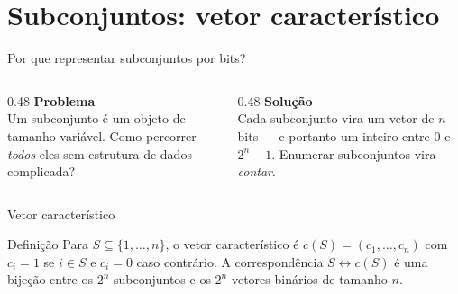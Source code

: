 \documentclass[aspectratio=169]{beamer}
\begin{document}
\section{Subconjuntos: vetor característico}

\begin{frame}{Por que representar subconjuntos por bits?}
  \begin{columns}[T]
    \begin{column}{0.48\textwidth}
      \textbf{Problema}\\[2pt]
      Um subconjunto é um objeto de tamanho variável. Como percorrer
      \emph{todos} eles sem estrutura de dados complicada?
    \end{column}
    \begin{column}{0.48\textwidth}
      \textbf{Solução}\\[2pt]
      Cada subconjunto vira um vetor de $n$ bits --- e portanto um inteiro
      entre $0$ e $2^n - 1$. Enumerar subconjuntos vira \emph{contar}.
    \end{column}
  \end{columns}
\end{frame}

\begin{frame}{Vetor característico}
  \begin{block}{Definição}
    Para $S \subseteq \{1,\dots,n\}$, o vetor característico é
    $c(S) = (c_1,\dots,c_n)$ com $c_i = 1$ se $i \in S$ e $c_i = 0$ caso contrário.
    A correspondência $S \leftrightarrow c(S)$ é uma bijeção entre os
    $2^n$ subconjuntos e os $2^n$ vetores binários de tamanho $n$.
  \end{block}
  \begin{center}
  \end{center}
\end{frame}
\end{document}
